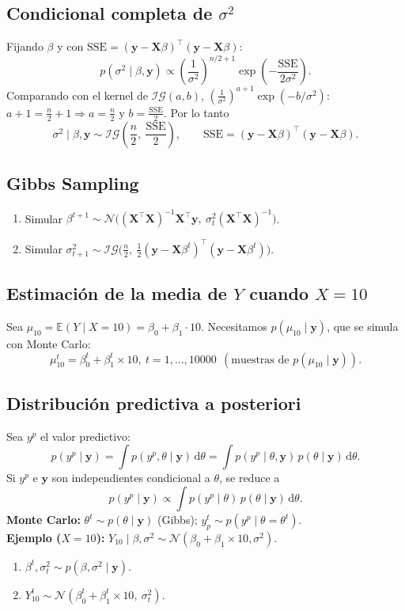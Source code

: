 \documentclass[11pt]{article}
\newcommand{\N}{\mathcal{N}}
\newcommand{\IG}{\mathcal{IG}}
\newcommand{\E}{\mathbb{E}}
\newcommand{\bX}{\mathbf{X}}
\newcommand{\by}{\mathbf{y}}
\newcommand{\dpar}{\mathrm{d}}
\theoremstyle{definition}
\begin{document}
\subsection{Condicional completa de $\sigma^2$}
Fijando $\beta$ y con $\text{SSE}=(\by-\bX\beta)^{\top}(\by-\bX\beta)$:
\[
p(\sigma^2\mid\beta,\by)\propto\left(\frac{1}{\sigma^2}\right)^{n/2+1}\exp\!\left(-\frac{\text{SSE}}{2\sigma^2}\right).
\]
Comparando con el kernel de $\IG(a,b)$, $\left(\tfrac{1}{\sigma^2}\right)^{a+1}\exp(-b/\sigma^2)$: $a+1=\tfrac{n}{2}+1\Rightarrow a=\tfrac{n}{2}$ y $b=\tfrac{\text{SSE}}{2}$. Por lo tanto
\[
\sigma^2\mid\beta,\by\sim\IG\!\left(\frac{n}{2},\ \frac{\text{SSE}}{2}\right),\qquad
\text{SSE}=(\by-\bX\beta)^{\top}(\by-\bX\beta).
\]

\subsection{Gibbs Sampling}
\begin{enumerate}[leftmargin=2em]
  \item Simular $\beta^{t+1}\sim\N\big((\bX^{\top}\bX)^{-1}\bX^{\top}\by,\ \sigma_t^2(\bX^{\top}\bX)^{-1}\big)$.
  \item Simular $\sigma^2_{t+1}\sim\IG\big(\tfrac{n}{2},\ \tfrac12(\by-\bX\beta^{t})^{\top}(\by-\bX\beta^{t})\big)$.
\end{enumerate}

\subsection{Estimación de la media de $Y$ cuando $X=10$}
Sea $\mu_{10}=\E(Y\mid X=10)=\beta_0+\beta_1\cdot 10$. Necesitamos $p(\mu_{10}\mid\by)$, que se simula con Monte Carlo:
\[
\mu_{10}^{t}=\beta_0^{t}+\beta_1^{t}\times 10,\ t=1,\dots,10000\ \ (\text{muestras de }p(\mu_{10}\mid\by)).
\]

\subsection{Distribución predictiva a posteriori}
Sea $y^p$ el valor predictivo:
\[
p(y^p\mid\by)=\int p(y^p,\theta\mid\by)\,\dpar\theta=\int p(y^p\mid\theta,\by)\,p(\theta\mid\by)\,\dpar\theta.
\]
Si $y^p$ e $\by$ son independientes condicional a $\theta$, se reduce a
\[
p(y^p\mid\by)\propto\int p(y^p\mid\theta)\,p(\theta\mid\by)\,\dpar\theta.
\]
\textbf{Monte Carlo:} $\theta^t\sim p(\theta\mid\by)$ (Gibbs); $y_p^t\sim p(y^p\mid\theta=\theta^t)$.\\
\textbf{Ejemplo ($X=10$):} $Y_{10}\mid\beta,\sigma^2\sim\N(\beta_0+\beta_1\times 10,\sigma^2)$.
\begin{enumerate}[leftmargin=2em]
  \item $\beta^t,\sigma_t^2\sim p(\beta,\sigma^2\mid\by)$.
  \item $Y_{10}^t\sim\N(\beta_0^t+\beta_1^t\times 10,\ \sigma_t^2)$.
\end{enumerate}
\end{document}
